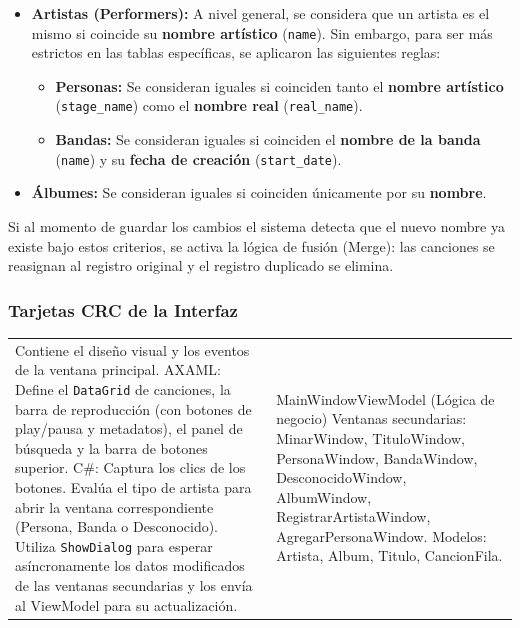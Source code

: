 \documentclass{article}
\newcommand{\tarjeta}[3]{%
      \begin{center}
      \begin{tabular}{|>{\raggedright\arraybackslash}p{7.8cm}|>{\raggedright\arraybackslash}p{4.2cm}|}
        \hline
        \multicolumn{2}{|c|}{#1} \\ \hline
        #2 & #3 \\ \hline
      \end{tabular}
      \end{center}
    }
\begin{document}
\begin{itemize}
    \item \textbf{Artistas (Performers):} A nivel general, se considera que un artista es el mismo si coincide su \textbf{nombre artístico} (\texttt{name}). Sin embargo, para ser más estrictos en las tablas específicas, se aplicaron las siguientes reglas:
    \begin{itemize}
        \item \textbf{Personas:} Se consideran iguales si coinciden tanto el \textbf{nombre artístico} (\texttt{stage\_name}) como el \textbf{nombre real} (\texttt{real\_name}).
        \item \textbf{Bandas:} Se consideran iguales si coinciden el \textbf{nombre de la banda} (\texttt{name}) y su \textbf{fecha de creación} (\texttt{start\_date}).
    \end{itemize}
    \item \textbf{Álbumes:} Se consideran iguales si coinciden únicamente por su \textbf{nombre}.
\end{itemize}

Si al momento de guardar los cambios el sistema detecta que el nuevo nombre ya existe bajo estos criterios, se activa la lógica de fusión (Merge): las canciones se reasignan al registro original y el registro duplicado se elimina.

\subsubsection{Tarjetas CRC de la Interfaz}

    \tarjeta{MainWindow (Vista Principal)}
    {Contiene el diseño visual y los eventos de la ventana principal.\newline
    AXAML: Define el \texttt{DataGrid} de canciones, la barra de reproducción (con botones de play/pausa y metadatos), el panel de búsqueda y la barra de botones superior.\newline
    C\#: Captura los clics de los botones. Evalúa el tipo de artista para abrir la ventana correspondiente (Persona, Banda o Desconocido). Utiliza \texttt{ShowDialog} para esperar asíncronamente los datos modificados de las ventanas secundarias y los envía al ViewModel para su actualización.}
    {MainWindowViewModel (Lógica de negocio)\newline
    Ventanas secundarias: MinarWindow, TituloWindow, PersonaWindow, BandaWindow, DesconocidoWindow, AlbumWindow, RegistrarArtistaWindow, AgregarPersonaWindow.\newline
    Modelos: Artista, Album, Titulo, CancionFila.}
    
\end{document}
